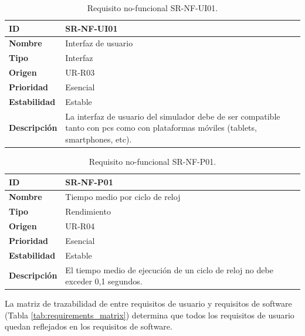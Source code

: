 \begin{center}
\begin{table}[htbp]
\centering
\caption{Requisito no-funcional SR-NF-UI01.}
\begin{tabular}{@{}p{2.5cm} p{9cm}@{}} 
\toprule
\textbf{ID} 				& SR-NF-UI01 \\
\midrule
\textbf{Nombre} 			& Interfaz de usuario \\
\midrule
\textbf{Tipo} 			& Interfaz \\
\midrule
\textbf{Origen} 			& UR-R03 \\
\midrule
\textbf{Prioridad}		& Esencial \\
\midrule
\textbf{Estabilidad} 		& Estable \\
\midrule
\textbf{Descripción} 	& La interfaz de usuario del simulador debe de ser compatible tanto con \acrshort{pc}s como con plataformas móviles (tablets, smartphones, etc). \\
\bottomrule
\end{tabular}
\label{tab:srnfui01}
\end{table}
\end{center}

\begin{center}
\begin{table}[htbp]
\centering
\caption{Requisito no-funcional SR-NF-P01.}
\begin{tabular}{@{}p{2.5cm} p{9cm}@{}} 
\toprule
\textbf{ID} 				& SR-NF-P01 \\
\midrule
\textbf{Nombre} 			& Tiempo medio por ciclo de reloj \\
\midrule
\textbf{Tipo} 			& Rendimiento \\
\midrule
\textbf{Origen} 			& UR-R04 \\
\midrule
\textbf{Prioridad}		& Esencial \\
\midrule
\textbf{Estabilidad} 		& Estable \\
\midrule
\textbf{Descripción} 	& El tiempo medio de ejecución de un ciclo de reloj no debe exceder 0,1 segundos. \\
\bottomrule
\end{tabular}
\label{tab:srnfp01}
\end{table}
\end{center}

La matriz de trazabilidad de entre requisitos de usuario y requisitos de \gls{software} (Tabla \ref{tab:requirements_matrix}) determina que todos los requisitos de usuario quedan reflejados en los requisitos de \gls{software}.

